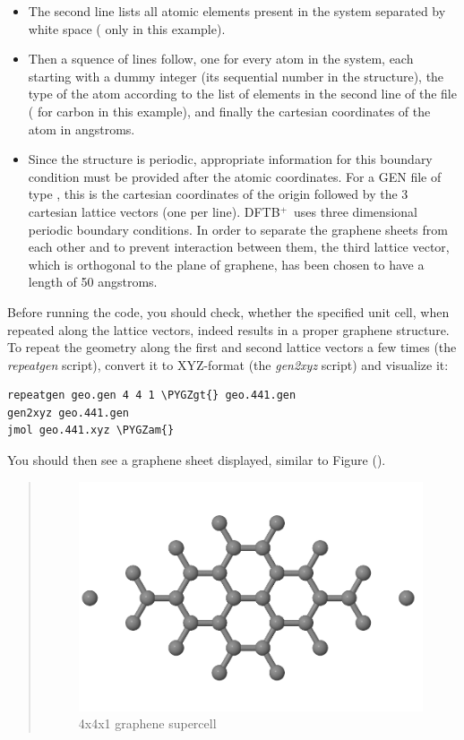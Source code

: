 \documentclass[a4paper,11pt,english]{sphinxmanual}
\newcommand{\dftbp}{\textsf{DFTB$^{\text{+}}$\ }} %
\def\PYGZam{\char`\&}
\def\PYGZgt{\char`\>}
\begin{document}
{{\begin{itemize}
\item {} 
The second line lists all atomic elements present in the system
separated by white space ( only in this example).

\item {} 
Then a squence of lines follow, one for every atom in the system,
each starting with a dummy integer (its sequential number in the
structure), the type of the atom according to the list of elements
in the second line of the file ( for carbon in this example),
and finally the cartesian coordinates of the atom in angstroms.

\item {} 
Since the structure is periodic, appropriate information for this
boundary condition must be provided after the atomic
coordinates. For a GEN file of type , this is the cartesian
coordinates of the origin followed by the 3 cartesian lattice
vectors (one per line). \dftbp uses three dimensional periodic
boundary conditions. In order to separate the graphene sheets from
each other and to prevent interaction between them, the third
lattice vector, which is orthogonal to the plane of graphene, has
been chosen to have a length of 50 angstroms.

\end{itemize}

Before running the code, you should check, whether the specified unit
cell, when repeated along the lattice vectors, indeed results in a
proper graphene structure. To repeat the geometry along the first and
second lattice vectors a few times (the \emph{repeatgen} script), convert
it to XYZ-format (the \emph{gen2xyz} script) and visualize it:

\begin{Verbatim}[commandchars=\\\{\}]
repeatgen geo.gen 4 4 1 \PYGZgt{} geo.441.gen
gen2xyz geo.441.gen
jmol geo.441.xyz \PYGZam{}
\end{Verbatim}

You should then see a graphene sheet displayed, similar to Figure
{\hyperref[electstruct:fig-graphene-441]{\emph{}}} ().
\begin{quote}
\begin{figure}[htbp]
\centering
\capstart
\includegraphics[width=0.600\linewidth]{geo-441.png}
\caption{4x4x1 graphene supercell}\label{electstruct:fig-graphene-441}\end{figure}
\end{quote}

}}
\end{document}
